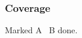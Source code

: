 \documentclass{ltx-talk}
\begin{document}
\begin{frame}
\frametitle{Coverage}
Marked A \checkmark\ B done.
\end{frame}
\end{document}
